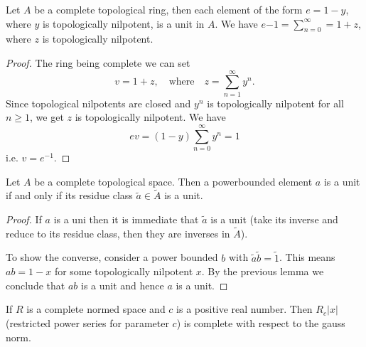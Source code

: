 \begin{lemma}
  Let $A$ be a complete topological ring, then each element of the form $e = 1 - y$, where $y$ is topologically
  nilpotent, is a unit in $A$.
  We have $ e{-1} = \sum_{n=0}^\infty = 1 + z$, where $z$ is topologically nilpotent.
\end{lemma}

\begin{proof}
  The ring being complete we can set
  \[
    v = 1 + z, \quad \text{where} \quad z = \sum_{n=1}^\infty y^n.
  \]
  Since topological nilpotents are closed and $y^n$ is topologically nilpotent for all $n \geq 1$, we
  get $z$ is topologically nilpotent. We have
  \[
    e v = (1 - y) \sum_{n = 0}^{\infty} y^n = 1
  \]
  i.e. $v = e^{-1}$.
\end{proof}


\begin{lemma}
  Let $A$ be a complete topological space. Then a powerbounded element $a$ is a unit if and only if
  its residue class $\tilde{a} \in \tilde{A}$ is a unit.
\end{lemma}

\begin{proof}
  If $a$ is a uni then it is immediate that $\tilde{a}$ is a unit (take its inverse and reduce to
  its residue class, then they are inverses in $\tilde{A}$).

  To show the converse, consider a power bounded $b$ with $\tilde{a} \tilde{b} = \tilde{1}$. This
  means $a b = 1 - x$ for some topologically nilpotent $x$. By the previous lemma we conclude that
  $ab$ is a unit and hence $a$ is a unit.
\end{proof}

\begin{lemma}
  If $R$ is a complete normed space and $c$ is a positive real number. Then $R_c\lvert x \rvert$
  (restricted power series for parameter $c$) is complete with respect to the gauss norm.
\end{lemma}


